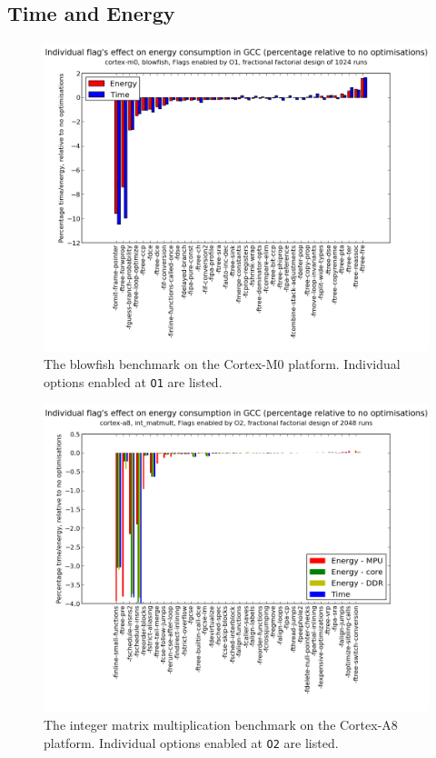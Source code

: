 \documentclass[twocolumn]{article}
\begin{document}


\subsection*{Time and Energy}

\begin{figure}
	\includegraphics[width=\linewidth]{cortex-m0/O1_main_effects_blowfish.png}
	\caption{The blowfish benchmark on the Cortex-M0 platform. Individual options enabled at \texttt{O1} are listed.}
	\label{Fig:BlowfishMainEffects}
\end{figure}

\begin{figure}
	\includegraphics[width=\linewidth]{cortex-a8/O2_main_effects_int_matmult.png}
	\caption{The integer matrix multiplication benchmark on the Cortex-A8 platform. Individual options enabled at \texttt{O2} are listed.}
	\label{Fig:IntMatmultO2MainEffects}
\end{figure}
\end{document}
